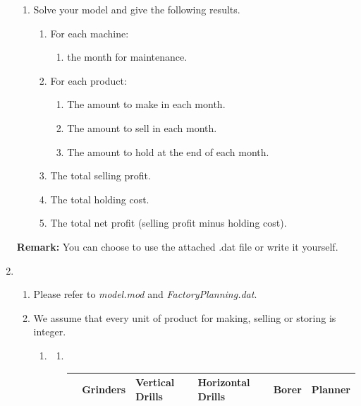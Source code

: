 \documentclass[12pt,a4paper]{article}
\makeatletter
\newtheorem*{solution}{Solution}
\theoremstyle{definition}
\renewenvironment{solution}[1][Solution] {\par\pushQED{\qed}\normalfont\topsep6\p@\@plus6\p@\relax\trivlist\item[\hskip\labelsep\bfseries#1\@addpunct{.}]\ignorespaces}{\popQED\endtrivlist\@endpefalse} \makeatother
\makeatother
\begin{document}
\begin{enumerate}
\begin{enumerate}
    \item
    Solve your model and give the following results.
    \begin{enumerate}
    \item
    For each machine:
    \begin{enumerate}
    \item
    the month for maintenance.
    \end{enumerate}
    \item
    For each product:
    \begin{enumerate}
    \item
    The amount to make in each month.
    \item
    The amount to sell in each month.
    \item
    The amount to hold at the end of each month.
    \end{enumerate}
    \item
    The total selling profit.
    \item
    The total holding cost.
    \item
    The total net profit (selling profit minus holding cost).
    \end{enumerate}
    \end{enumerate}
    \textbf{Remark:} You can choose to use the attached .dat file or write it yourself. 
    \begin{solution}
    ~
    \begin{enumerate}
        \item 
        Please refer to \emph{model.mod} and \emph{FactoryPlanning.dat}.
        \item
        We assume that every unit of product for making, selling or storing is integer.
        \begin{enumerate}
            \item
            \begin{enumerate}
                \item 
                ~
                \begin{table}[htbp]
          \scriptsize
          \centering
          \renewcommand\arraystretch{1.1}
          \begin{tabular}{m{} m{}<{\centering} m{}<{\centering} m{}<{\centering} m{}<{\centering} m{}<{\centering}}
          \hline
           & \textbf{Grinders} & \textbf{Vertical Drills} & \textbf{Horizontal Drills} & \textbf{Borer} & \textbf{Planner}  \\\hline

\end{tabular}
\end{table}
\end{enumerate}
\end{enumerate}
\end{enumerate}
\end{solution}
\end{enumerate}
\end{document}
